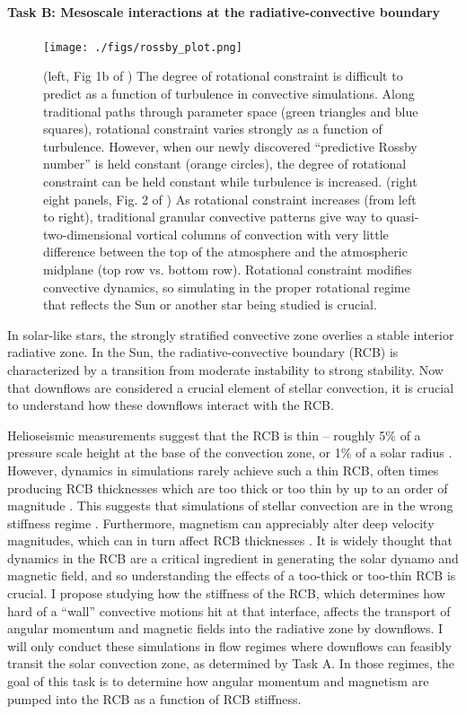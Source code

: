 \documentclass[11pt, preprint]{aastex}
\begin{document}
\paragraph{Task B: Mesoscale interactions at the radiative-convective boundary}
\label{sct:taskB}
\begin{figure}[t!]
    \texttt{[image: ./figs/rossby\_plot.png]}
    \caption{(left, Fig 1b of \citet{anders&all2019}) The degree of rotational constraint is difficult to predict as a function of turbulence in convective simulations.
	Along traditional paths through parameter space (green triangles and blue squares), rotational constraint varies strongly as a function of turbulence.
	However, when our newly discovered ``predictive Rossby number'' is held constant (orange circles), the degree of rotational constraint can be held constant while turbulence is increased.
	(right eight panels, Fig. 2 of \citet{anders&all2019}) As rotational constraint increases (from left to right), traditional granular convective patterns give way to quasi-two-dimensional vortical columns of convection with very little difference between the top of the atmosphere and the atmospheric midplane (top row vs. bottom row).
	Rotational constraint modifies convective dynamics, so simulating in the proper rotational regime that reflects the Sun or another star being studied is crucial.
	\label{fig:rossby_plot} }
\end{figure}

In solar-like stars, the strongly stratified convective zone overlies a stable interior radiative zone.
In the Sun, the radiative-convective boundary (RCB) is characterized by a transition from moderate instability to strong stability.
Now that downflows are considered a crucial element of stellar convection, it is crucial to understand how these downflows interact with the RCB.

Helioseismic measurements suggest that the RCB is thin -- roughly 5\% of a pressure scale height at the base of the convection zone, or 1\% of a solar radius \citep{basu1997}.
However, dynamics in simulations rarely achieve such a thin RCB, often times producing RCB thicknesses which are too thick or too thin by up to an order of magnitude \citep[see e.g.,][]{hotta2017, kapyla2018}.
This suggests that simulations of stellar convection are in the wrong stiffness regime \citep{brummell&all2002, couston&all2017}.
Furthermore, magnetism can appreciably alter deep velocity magnitudes, which can in turn affect RCB thicknesses \citep{hotta&all2015}.
It is widely thought that dynamics in the RCB are a critical ingredient in generating the solar dynamo and magnetic field, and so understanding the effects of a too-thick or too-thin RCB is crucial.
I propose studying how the stiffness of the RCB, which determines how hard of a ``wall'' convective motions hit at that interface, affects the transport of angular momentum and magnetic fields into the radiative zone by downflows.
I will only conduct these simulations in flow regimes where downflows can feasibly transit the solar convection zone, as determined by Task A.
In those regimes, the goal of this task is to determine how angular momentum and magnetism are pumped into the RCB as a function of RCB stiffness.
\end{document}
